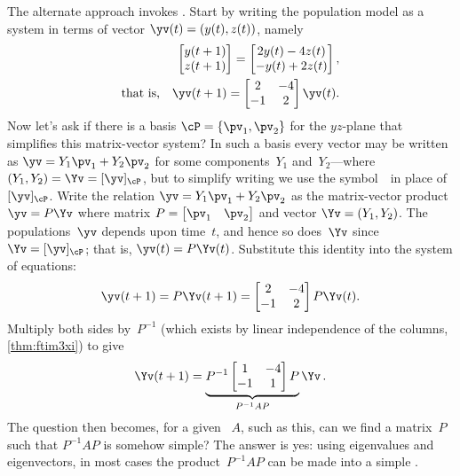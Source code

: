 The alternate approach invokes .
Start by writing the population model as a system in terms of vector \(\yv(t)=(y(t),z(t))\), namely
\begin{eqnarray*}&&
\begin{bmatrix} y(t+1)\\z(t+1) \end{bmatrix}
=\begin{bmatrix} 2y(t)-4z(t)\\-y(t)+2z(t) \end{bmatrix}
,\\\text{that is,}&&
\yv(t+1)=\begin{bmatrix} 2&-4\\-1&2 \end{bmatrix}\yv(t).
\end{eqnarray*}
Now let's ask if there is a basis \(\cP=\{\pv_1,\pv_2\}\) for the \(yz\)-plane that simplifies this matrix-vector system?
In such a basis every vector may be written as \(\yv=Y_1\pv_1+Y_2\pv_2\) for some components~\(Y_1\) and~\(Y_2\)---where \((Y_1,Y_2)=\Yv=[\yv]_\cP\), but to simplify writing we use the symbol~\Yv\ in place of~\([\yv]_\cP\).
Write the relation \(\yv=Y_1\pv_1+Y_2\pv_2\) as the matrix-vector product \(\yv=P\Yv\) where matrix \(P=\begin{bmatrix} \pv_1&\pv_2 \end{bmatrix}\) and vector \(\Yv=(Y_1,Y_2)\).
The populations~\(\yv\) depends upon time~\(t\), and hence so does~\(\Yv\) since \(\Yv=[\yv]_\cP\); that is, \(\yv(t)=P\Yv(t)\).
Substitute this identity into the system of equations:
\begin{equation*}
\yv(t+1)=P\Yv(t+1)=\begin{bmatrix} 2&-4\\-1&2 \end{bmatrix}P\Yv(t).
\end{equation*}
Multiply both sides by~\(P^{-1}\) (which exists by linear independence of the columns, \autoref{thm:ftim3xi}) to give
\begin{equation*}
\Yv(t+1)=\underbrace{P^{-1}\begin{bmatrix} 1&-4\\-1&1 \end{bmatrix}P}_{P^{-1}AP}\Yv\,.
\end{equation*}
The question then becomes, for a given ~\(A\), such as this, can we find a matrix~\(P\) such that \(P^{-1}AP\) is somehow simple?
The answer is yes: using eigenvalues and eigenvectors, in most cases the product~\(P^{-1}AP\) can be made into a simple .




